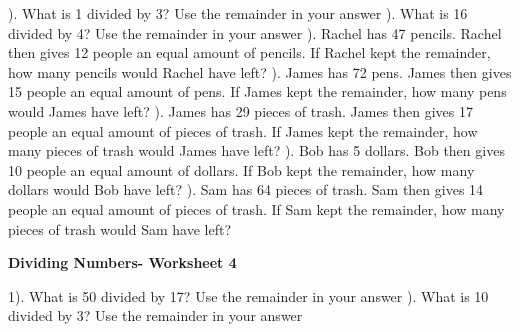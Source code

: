 \documentclass{article}%
\begin{document}
). What is 1 divided by 3? Use the remainder in your answer%
\newline%
\newline%
). What is 16 divided by 4? Use the remainder in your answer%
\newline%
\newline%
). Rachel has 47 pencils. Rachel then gives 12 people an equal amount of pencils. If Rachel kept the remainder, how many pencils would Rachel have left?%
\newline%
\newline%
). James has 72 pens. James then gives 15 people an equal amount of pens. If James kept the remainder, how many pens would James have left?%
\newline%
\newline%
). James has 29 pieces of trash. James then gives 17 people an equal amount of pieces of trash. If James kept the remainder, how many pieces of trash would James have left?%
\newline%
\newline%
). Bob has 5 dollars. Bob then gives 10 people an equal amount of dollars. If Bob kept the remainder, how many dollars would Bob have left?%
\newline%
\newline%
). Sam has 64 pieces of trash. Sam then gives 14 people an equal amount of pieces of trash. If Sam kept the remainder, how many pieces of trash would Sam have left?%
\newline%
\newline%
\newline%
\pagebreak%
\large%
\begin{center}%
\textbf{Dividing Numbers- Worksheet 4}%
\newline%
\end{center} \normalsize%
1). What is 50 divided by 17? Use the remainder in your answer%
\newline%
\newline%
). What is 10 divided by 3? Use the remainder in your answer%
\newline%
\newline%
\end{document}
